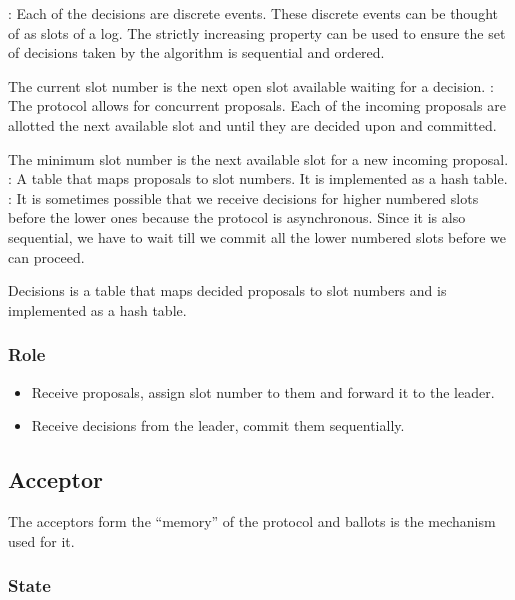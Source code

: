 \begin{itemize}
    : Each of the decisions are discrete events.
    These discrete events can be thought of as slots of a log. The strictly
    increasing property can be used to ensure the set of decisions taken by
    the algorithm is sequential and ordered.

    The current slot number is the next open slot available waiting for a
    decision.
    : The protocol allows for concurrent proposals.
    Each of the incoming proposals are allotted the next available slot and
    until they are decided upon and committed.

    The minimum slot number is the next available slot for a new incoming
    proposal.
    : A table that maps proposals to slot numbers. It is
    implemented as a hash table.
    : It is sometimes possible that we receive decisions for
    higher numbered slots before the lower ones because the protocol is
    asynchronous. Since it is also sequential, we have to wait till we
    commit all the lower numbered slots before we can proceed.

   Decisions is a table that maps decided proposals to slot numbers and is
   implemented as a hash table.
\end{itemize}

\subsubsection{Role}

\begin{itemize}
  \item Receive proposals, assign slot number to them and forward it to the
    leader.
  \item Receive decisions from the leader, commit them sequentially.
\end{itemize}

\subsection{Acceptor}

The acceptors form the ``memory'' of the protocol and ballots is the
mechanism used for it.

\subsubsection{State}

